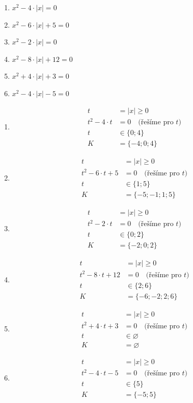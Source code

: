 \documentclass[11pt,a4paper]{article}
\begin{document}
\begin{zadaniReseniBox}[title={Domácí úkol}]
\begin{enumerate}[label=\alph*),itemsep=2pt]
\item $x^{2} - 4 \cdot \left|{x}\right|=0$
\item $x^{2} - 6 \cdot \left|{x}\right| + 5=0$
\item $x^{2} - 2 \cdot \left|{x}\right|=0$
\item $x^{2} - 8 \cdot \left|{x}\right| + 12=0$
\item $x^{2} + 4 \cdot \left|{x}\right| + 3=0$
\item $x^{2} - 4 \cdot \left|{x}\right| - 5=0$
\end{enumerate}
\tcblower
\begin{enumerate}[label=\alph*),itemsep=2pt]
\item
\[\begin{aligned}
t&=|x|\ge0\\[2pt]
t^{2} - 4 \cdot t&=0\quad\text{(řešíme pro }t\text{)}\\[2pt]
t&\in \{0;4\}\\[2pt]
K&=\{-4;0;4\}
\end{aligned}\]
\item
\[\begin{aligned}
t&=|x|\ge0\\[2pt]
t^{2} - 6 \cdot t + 5&=0\quad\text{(řešíme pro }t\text{)}\\[2pt]
t&\in \{1;5\}\\[2pt]
K&=\{-5;-1;1;5\}
\end{aligned}\]
\item
\[\begin{aligned}
t&=|x|\ge0\\[2pt]
t^{2} - 2 \cdot t&=0\quad\text{(řešíme pro }t\text{)}\\[2pt]
t&\in \{0;2\}\\[2pt]
K&=\{-2;0;2\}
\end{aligned}\]
\item
\[\begin{aligned}
t&=|x|\ge0\\[2pt]
t^{2} - 8 \cdot t + 12&=0\quad\text{(řešíme pro }t\text{)}\\[2pt]
t&\in \{2;6\}\\[2pt]
K&=\{-6;-2;2;6\}
\end{aligned}\]
\item
\[\begin{aligned}
t&=|x|\ge0\\[2pt]
t^{2} + 4 \cdot t + 3&=0\quad\text{(řešíme pro }t\text{)}\\[2pt]
t&\in \varnothing\\[2pt]
K&=\varnothing
\end{aligned}\]
\item
\[\begin{aligned}
t&=|x|\ge0\\[2pt]
t^{2} - 4 \cdot t - 5&=0\quad\text{(řešíme pro }t\text{)}\\[2pt]
t&\in \{5\}\\[2pt]
K&=\{-5;5\}
\end{aligned}\]
\end{enumerate}
\end{zadaniReseniBox}
\end{document}
